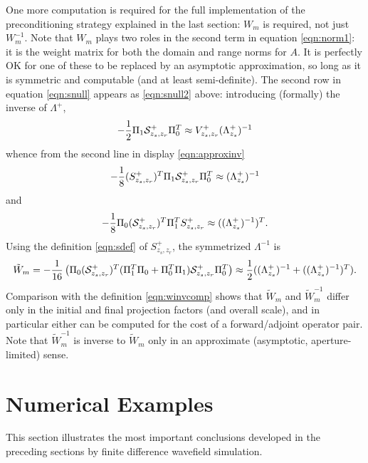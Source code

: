 One more computation is required for the full implementation of the
preconditioning strategy explained in the last section: $W_m$ is
required, not just $W_m^{-1}$. Note that $W_m$ plays two roles in the
second term in equation \ref{eqn:norm1}: it is the weight matrix for
both the domain and range norms for $A$. It is perfectly OK for one of
these to be replaced by an asymptotic approximation, so long as it is
symmetric and computable (and at least semi-definite). The second row
in equation \ref{eqn:snull} appears as \ref{eqn:snull2} above:
introducing (formally) the inverse of $\Lambda^+$,
\begin{equation}
  \label{eqn:snull2mod}
-\frac{1}{2}\Pi_1{\cal S}^{+}_{z_s,z_r}\Pi_0^T  \approx
V^{+}_{z_s,z_r}(\Lambda^{+}_{z_s})^{-1}
\end{equation}
whence from the second line in display \ref{eqn:approxinv}
\begin{equation}
  \label{eqn:laminv}
-\frac{1}{8}(S^+_{z_s,z_r})^T\Pi_1{\cal S}^{+}_{z_s,z_r}\Pi_0^T  
\approx (\Lambda^{+}_{z_s})^{-1}
\end{equation} 
and
\begin{equation}
  \label{eqn:laminvtr}
-\frac{1}{8}\Pi_0({\cal S}^{+}_{z_s,z_r})^T\Pi_1^T S^+_{z_s,z_r}
\approx ((\Lambda^{+}_{z_s})^{-1})^T.
\end{equation}
Using the definition \ref{eqn:sdef} of $S^+_{z_s,z_r}$, the
symmetrized $\Lambda^{-1}$ is
\begin{equation}
  \label{wcomp}
 \tilde{W}_m = -\frac{1}{16}\left(\Pi_0 ({\cal S}^{+}_{z_s,z_r})^T
   (\Pi_1^T \Pi_0 + \Pi_0^T \Pi_1) {\cal S}^{+}_{z_s,z_r} \Pi_0^T\right)
   \approx \frac{1}{2}((\Lambda^{+}_{z_s})^{-1}
   +((\Lambda^{+}_{z_s})^{-1})^T) .
\end{equation}
Comparison with the definition \ref{eqn:winvcomp} shows that
$\tilde{W}_m$ and $\tilde{W}_m^{-1}$ differ only in the initial and
final projection factors (and overall scale), and in particular either
can be computed for the cost of a forward/adjoint operator pair. Note
that $\tilde{W}_m^{-1}$ is inverse to $\tilde{W}_m$ only in an
approximate (asymptotic, aperture-limited) sense.

\section{Numerical Examples}
This section illustrates the most important conclusions developed in
the preceding sections by finite difference wavefield simulation.

